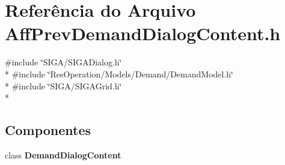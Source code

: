 \section{Referência do Arquivo Aff\+Prev\+Demand\+Dialog\+Content.\+h}
\label{_aff_prev_demand_dialog_content_8h}
{\ttfamily \#include \char`\"{}S\+I\+G\+A/\+S\+I\+G\+A\+Dialog.\+h\char`\"{}}\\*
{\ttfamily \#include \char`\"{}Res\+Operation/\+Models/\+Demand/\+Demand\+Model.\+h\char`\"{}}\\*
{\ttfamily \#include \char`\"{}S\+I\+G\+A/\+S\+I\+G\+A\+Grid.\+h\char`\"{}}\\*
\subsection*{Componentes}
\begin{DoxyCompactItemize}
\item 
class {\bf Demand\+Dialog\+Content}
\end{DoxyCompactItemize}
